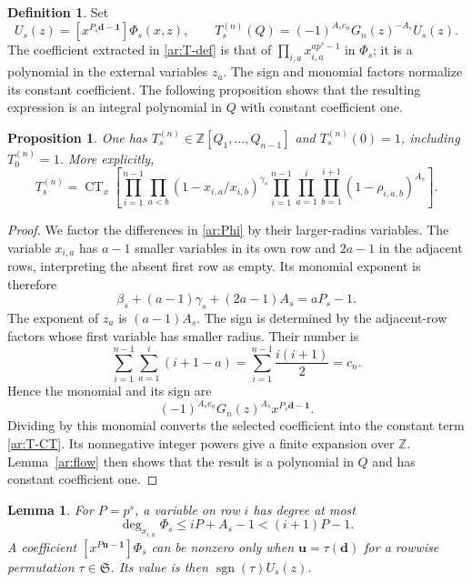 \documentclass[11pt]{amsart}
\newtheorem{lemma}[theorem]{Lemma}
\newtheorem{proposition}[theorem]{Proposition}
\theoremstyle{definition}
\newtheorem{definition}[theorem]{Definition}
\theoremstyle{remark}
\numberwithin{equation}{section}
\newcommand{\Z}{\mathbb Z}
\DeclareMathOperator{\CT}{CT}
\newcommand{\sgn}{\operatorname{sgn}}
\begin{document}
\begin{definition}\label{ar:approximants}
Set
\begin{equation}\label{ar:T-def}
 U_s(z)=[x^{P_s\mathbf d-\mathbf1}]\Phi_s(x,z),\qquad
 T_s^{(n)}(Q)=(-1)^{A_sc_n}G_n(z)^{-A_s}U_s(z).
\end{equation}
The coefficient extracted in \eqref{ar:T-def} is that of
$\prod_{i,a}x_{i,a}^{ap^s-1}$ in $\Phi_s$; it is a polynomial
in the external variables $z_a$. The sign and monomial factors
normalize its constant coefficient. The following proposition
shows that the resulting expression is an integral polynomial
in $Q$ with constant coefficient one.
\end{definition}

\begin{proposition}\label{ar:normalization}
One has $T_s^{(n)}\in\Z[Q_1,\ldots,Q_{n-1}]$ and
$T_s^{(n)}(0)=1$, including $T_0^{(n)}=1$. More explicitly,
\begin{equation}\label{ar:T-CT}
 T_s^{(n)}=\CT_x
 \left[
 \prod_{i=1}^{n-1}\prod_{a<b}
       (1-x_{i,a}/x_{i,b})^{\gamma_s}
 \prod_{i=1}^{n-1}\prod_{a=1}^i\prod_{b=1}^{i+1}
       (1-\rho_{i,a,b})^{A_s}
 \right].
\end{equation}
\end{proposition}

\begin{proof}
We factor the differences in \eqref{ar:Phi} by their larger-radius
variables. The variable $x_{i,a}$ has $a-1$ smaller variables in
its own row and $2a-1$ in the adjacent rows, interpreting the
absent first row as empty. Its monomial exponent is therefore
\[
 \beta_s+(a-1)\gamma_s+(2a-1)A_s=aP_s-1.
\]
The exponent of $z_a$ is $(a-1)A_s$. The sign is determined by
the adjacent-row factors whose first variable has smaller radius.
Their number is
\[
 \sum_{i=1}^{n-1}\sum_{a=1}^i(i+1-a)
 =\sum_{i=1}^{n-1}\frac{i(i+1)}2=c_n.
\]
Hence the monomial and its sign are
\begin{equation}\label{ar:leading-monomial}
 (-1)^{A_sc_n}G_n(z)^{A_s}x^{P_s\mathbf d-\mathbf1}.
\end{equation}
Dividing by this monomial converts the selected coefficient into
the constant term \eqref{ar:T-CT}. Its nonnegative integer powers
give a finite expansion over $\Z$. Lemma~\ref{ar:flow} then shows
that the result is a polynomial in $Q$ and has constant coefficient
one.
\end{proof}

\begin{lemma}\label{ar:master-support}
For $P=p^s$, a variable on row $i$ has degree at most
\[
 \deg_{x_{i,a}}\Phi_s\leq iP+A_s-1<(i+1)P-1.
\]
A coefficient $[x^{P\boldsymbol u-\mathbf1}]\Phi_s$ can be
nonzero only when $\boldsymbol u=\tau(\mathbf d)$ for a rowwise
permutation $\tau\in\mathfrak S$. Its value is then
$\sgn(\tau)U_s(z)$.
\end{lemma}
\end{document}
